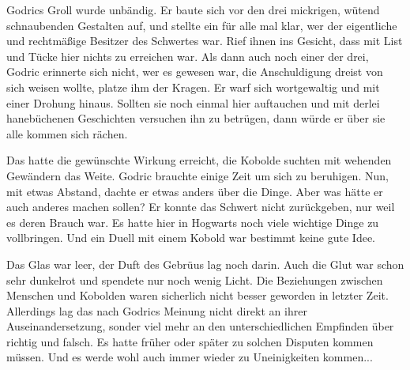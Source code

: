 \documentclass[fontsize=12pt]{scrartcl}
\begin{document}
	Godrics Groll wurde unbändig. Er baute sich vor den drei mickrigen, wütend schnaubenden Gestalten auf, und stellte ein für alle mal klar, wer der eigentliche und rechtmäßige Besitzer des Schwertes war. Rief ihnen ins Gesicht, dass mit List und Tücke hier nichts zu erreichen war. Als dann auch noch einer der drei, Godric erinnerte sich nicht, wer es gewesen war, die Anschuldigung dreist von sich weisen wollte, platze ihm der Kragen. Er warf sich wortgewaltig und mit einer Drohung hinaus. Sollten sie noch einmal hier auftauchen und mit derlei hanebüchenen Geschichten versuchen ihn zu betrügen, dann würde er über sie alle kommen sich rächen. 
	
	Das hatte die gewünschte Wirkung erreicht, die Kobolde suchten mit wehenden Gewändern das Weite. Godric brauchte einige Zeit um sich zu beruhigen. Nun, mit etwas Abstand, dachte er etwas anders über die Dinge. Aber was hätte er auch anderes machen sollen? Er konnte das Schwert nicht zurückgeben, nur weil es deren Brauch war. Es hatte hier in Hogwarts noch viele wichtige Dinge zu vollbringen. Und ein Duell mit einem Kobold war bestimmt keine gute Idee.
	
	Das Glas war leer, der Duft des Gebrüus lag noch darin. Auch die Glut war schon sehr dunkelrot und spendete nur noch wenig Licht. Die Beziehungen zwischen Menschen und Kobolden waren sicherlich nicht besser geworden in letzter Zeit. Allerdings lag das nach Godrics Meinung nicht direkt an ihrer Auseinandersetzung, sonder viel mehr an den unterschiedlichen Empfinden über richtig und falsch. Es hatte früher oder später zu solchen Disputen kommen müssen. Und es werde wohl auch immer wieder zu Uneinigkeiten kommen...
	
	
\end{document}
